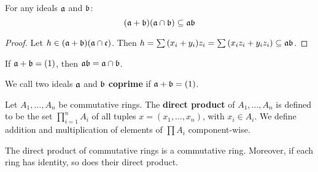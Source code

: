 \begin{theorem}\label{theorem_1.10.5}
  For any ideals $\af$ and $\bf$:
  \begin{equation}
    (\af+\bf)(\af \cap \bf) \subseteq \af\bf
  \end{equation}
\end{theorem}
\begin{proof}
  Let $h \in (\af+\bf)(\af \cap \cf)$. Then $h=\sum{(x_i+y_i)z_i}=
  \sum{(x_iz_i+y_iz_i)} \subseteq \af\bf$.
\end{proof}
\begin{corollary}
  If $\af+\bf=(1)$, then $\af\bf=\af \cap \bf$.
\end{corollary}

\begin{definition}
  We call two ideals $\af$ and  $\bf$  \textbf{coprime} if $\af+\bf=(1)$.
\end{definition}

\begin{definition}
  Let $A_1, \dots, A_n$ be commutative rings. The \textbf{direct product} of
  $A_1, \dots, A_n$ is defined to be the set $\prod_{i=1}^n{A_i}$ of all tuples
  $x=(x_1, \dots, x_n)$, with $x_i \in A_i$. We define addition and
  multiplication of elements of $\prod{A_i}$ component-wise.
\end{definition}

\begin{lemma}\label{lemma_1.10.6}
  The direct product of commutative rings is a commutative ring. Moreover, if
  each ring has identity, so does their direct product.
\end{lemma}

